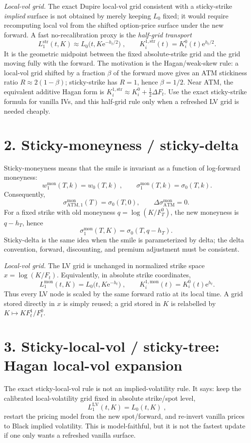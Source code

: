 \documentclass[8pt]{extarticle}
\newcommand{\sig}{\sigma}
\newcommand{\w}{w}
\newcommand{\ATM}{\mathrm{ATM}}
\newcommand{\str}{\mathrm{str}}
\newcommand{\mon}{\mathrm{mon}}
\newcommand{\LV}{\mathrm{LV}}
\newcommand{\e}{\mathrm{e}}
\begin{document}
\textit{Local-vol grid.} The exact Dupire local-vol grid consistent with a sticky-strike \emph{implied} surface is not obtained by merely keeping $L_0$ fixed; it would require recomputing local vol from the shifted option-price surface under the new forward. A fast no-recalibration proxy is the \emph{half-grid transport}
\[
        \boxed{\;L_1^{\str}(t,K)\approx L_0\bigl(t,K\e^{-h_t/2}\bigr)\;},
        \qquad K_i^{1,\str}(t)=K_i^0(t)\e^{h_t/2} .
\]
It is the geometric midpoint between the fixed absolute-strike grid and the grid moving fully with the forward. The motivation is the Hagan/weak-skew rule: a local-vol grid shifted by a fraction $\beta$ of the forward move gives an ATM stickiness ratio $R\approx2(1-\beta)$; sticky-strike has $R=1$, hence $\beta=1/2$. Near ATM, the equivalent additive Hagan form is $K_i^{1,\str}\approx K_i^0+\tfrac12\Delta F_t$. Use the exact sticky-strike formula for vanilla IVs, and this half-grid rule only when a refreshed LV grid is needed cheaply.

\section*{2. Sticky-moneyness / sticky-delta}
Sticky-moneyness means that the smile is invariant as a function of log-forward moneyness:
\[
        \boxed{\;\w_1^{\mon}(T,k)=\w_0(T,k)\;},
        \qquad
        \sig_1^{\mon}(T,k)=\sig_0(T,k) .
\]
Consequently,
\[
        \sig_{\ATM,1}^{\mon}(T)=\sig_0(T,0),
        \qquad
        \Delta\sig_{\ATM}^{\mon}=0 .
\]
For a fixed strike with old moneyness $q=\log(K/F_T^0)$, the new moneyness is $q-h_T$, hence
\[
        \sig_1^{\mon}(T,K)=\sig_0(T,q-h_T).
\]
Sticky-delta is the same idea when the smile is parameterized by delta; the delta convention, forward, discounting, and premium adjustment must be consistent.

\textit{Local-vol grid.} The LV grid is unchanged in normalized strike space $x=\log(K/F_t)$. Equivalently, in absolute strike coordinates,
\[
        \boxed{\;L_1^{\mon}(t,K)=L_0\bigl(t,K\e^{-h_t}\bigr)\;},
        \qquad K_i^{1,\mon}(t)=K_i^0(t)\e^{h_t} .
\]
Thus every LV node is scaled by the same forward ratio at its local time. A grid stored directly in $x$ is simply reused; a grid stored in $K$ is relabelled by $K\mapsto K F_t^1/F_t^0$.

\section*{3. Sticky-local-vol / sticky-tree: Hagan local-vol expansion}
The exact sticky-local-vol rule is not an implied-volatility rule. It says: keep the calibrated local-volatility grid fixed in absolute strike/spot level,
\[
        \boxed{\;L_1^{\LV}(t,K)=L_0(t,K)\;},
\]
restart the pricing model from the new spot/forward, and re-invert vanilla prices to Black implied volatility. This is model-faithful, but it is not the fastest update if one only wants a refreshed vanilla surface.
\end{document}

